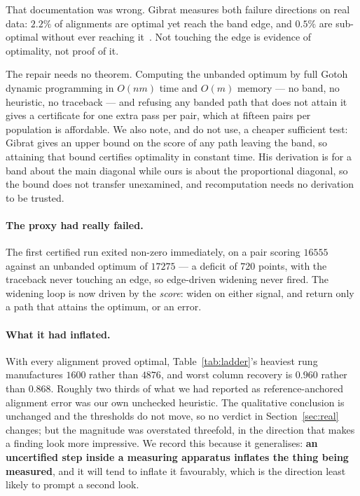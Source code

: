 \documentclass[11pt,a4paper]{article}
\theoremstyle{definition}
\theoremstyle{remark}
\begin{document}
That documentation was wrong. Gibrat measures both failure directions on real
data: $2.2\%$ of alignments are optimal yet reach the band edge, and $0.5\%$ are
sub-optimal without ever reaching it~\cite{gibrat}. Not touching the edge is
evidence of optimality, not proof of it.

The repair needs no theorem. Computing the unbanded optimum by full Gotoh
dynamic programming in $O(nm)$ time and $O(m)$ memory --- no band, no heuristic,
no traceback --- and refusing any banded path that does not attain it gives a
certificate for one extra pass per pair, which at fifteen pairs per population is
affordable. We also note, and do not use, a cheaper sufficient test: Gibrat gives
an upper bound on the score of any path leaving the band, so attaining that bound
certifies optimality in constant time. His derivation is for a band about the main
diagonal while ours is about the proportional diagonal, so the bound does not
transfer unexamined, and recomputation needs no derivation to be trusted.

\paragraph{The proxy had really failed.} The first certified run exited non-zero
immediately, on a pair scoring $16555$ against an unbanded optimum of $17275$ ---
a deficit of $720$ points, with the traceback never touching an edge, so
edge-driven widening never fired. The widening loop is now driven by the
\emph{score}: widen on either signal, and return only a path that attains the
optimum, or an error.

\paragraph{What it had inflated.} With every alignment proved optimal,
Table~\ref{tab:ladder}'s heaviest rung manufactures $1600$ rather than $4876$,
and worst column recovery is $0.960$ rather than $0.868$. Roughly two thirds of
what we had reported as reference-anchored alignment error was our own unchecked
heuristic. The qualitative conclusion is unchanged and the thresholds do not
move, so no verdict in Section~\ref{sec:real} changes; but the magnitude was
overstated threefold, in the direction that makes a finding look more impressive.
We record this because it generalises: \textbf{an uncertified step inside a
measuring apparatus inflates the thing being measured}, and it will tend to
inflate it favourably, which is the direction least likely to prompt a second
look.
\end{document}
